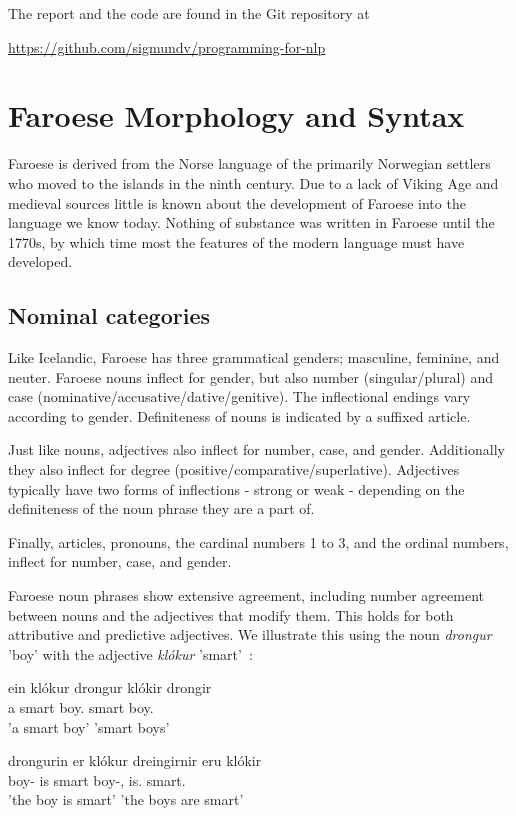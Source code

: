 \documentclass[12pt,%
]{lin-v2/lin}
\let\Oldsubsection\subsection
\renewcommand{\subsection}{\FloatBarrier\Oldsubsection}
\begin{document}
The report and the code are found in the Git repository at
\begin{center}
    \url{https://github.com/sigmundv/programming-for-nlp}
\end{center}

\section{Faroese Morphology and Syntax}

Faroese is derived from the Norse language of the primarily Norwegian settlers
who moved to the islands in the ninth century. Due to a lack of Viking Age
and medieval sources little is known about the development of Faroese into
the language we know today. Nothing of substance was written in Faroese
until the 1770s, by which time most the features of the modern language
must have developed.

\subsection{Nominal categories}

Like Icelandic, Faroese has three grammatical genders; masculine, feminine, and neuter.
Faroese nouns inflect for gender, but also number (singular/plural) and case (nominative/accusative/dative/genitive).
The inflectional endings vary according to gender. Definiteness of nouns is indicated by a suffixed article.

Just like nouns, adjectives also inflect for number, case, and gender. Additionally they also inflect for degree
(positive/comparative/superlative). Adjectives typically have two forms of inflections - strong or weak - depending
on the definiteness of the noun phrase they are a part of.

Finally, articles, pronouns, the cardinal numbers 1 to 3, and the ordinal numbers, inflect for number, case, and gender.

Faroese noun phrases show extensive agreement, including number agreement between nouns and the adjectives that modify them.
This holds for both attributive and predictive adjectives. We illustrate this using the noun \emph{drongur} 'boy'
with the adjective \emph{klókur} 'smart'~\citep[61]{faroese}:
\begin{exe}
    \ex
    \begin{xlist}
    \item \gll ein klókur drongur klókir drongir\\
    a smart boy.\Sg{} smart boy.\Pl{}\\
    \trans 'a smart boy' 'smart boys'
    \item \gll drongurin er klókur dreingirnir eru klókir\\
    boy-\Det{} is smart boy-\Det,\Pl{} is.\Pl{} smart.\Pl\\
    \trans 'the boy is smart' 'the boys are smart'
    \end{xlist}
\end{exe}
\end{document}
